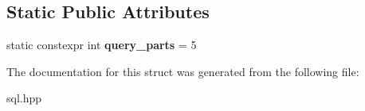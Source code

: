 \subsection*{Static Public Attributes}
\begin{DoxyCompactItemize}
\item 
\mbox{\label{structmods_1_1sql_1_1compositor_a81b234d5bc3438ebb9e3af66fdc6e9fe}} 
static constexpr int {\bfseries query\+\_\+parts} = 5
\end{DoxyCompactItemize}


The documentation for this struct was generated from the following file\+:\begin{DoxyCompactItemize}
\item 
sql.\+hpp\end{DoxyCompactItemize}
